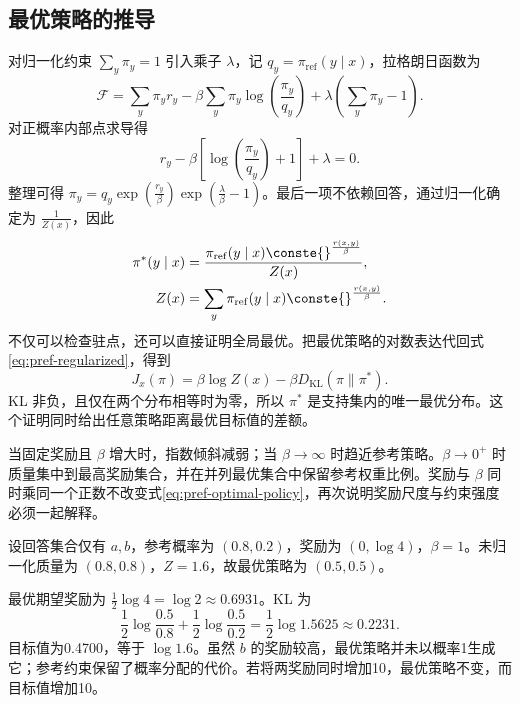 \documentclass[../textbook.tex]{subfiles}
\begin{document}
\subsection{最优策略的推导}
对归一化约束 $\sum_y\pi_y=1$ 引入乘子 $\lambda$，记 $q_y=\pi_{\mathrm{ref}}(y\mid x)$，拉格朗日函数为
\begin{equation}
 \mathcal F=\sum_y\pi_yr_y-\beta\sum_y\pi_y\log(\frac{\pi_y}{q_y})
 +\lambda(\sum_y\pi_y-1).
\end{equation}
对正概率内部点求导得
\begin{equation}
 r_y-\beta[\log(\frac{\pi_y}{q_y})+1]+\lambda=0.
\end{equation}
整理可得 $\pi_y=q_y\exp(\frac{r_y}{\beta})\exp(\frac{\lambda}{\beta}-1)$。最后一项不依赖回答，通过归一化确定为 $\frac{1}{Z(x)}$，因此
\begin{equation}\label{eq:pref-optimal-policy}
\begin{aligned}
 \pi^*(y\mid x) &= \frac{\pi_{\mathrm{ref}}(y\mid x)\conste{}^{\frac{r(x,y)}{\beta}}}{Z(x)}, \\
 Z(x) &= \sum_y\pi_{\mathrm{ref}}(y\mid x)\conste{}^{\frac{r(x,y)}{\beta}}.
\end{aligned}
\end{equation}
不仅可以检查驻点，还可以直接证明全局最优。把最优策略的对数表达代回式\eqref{eq:pref-regularized}，得到
\begin{equation}
 J_x(\pi)=\beta\log Z(x)-\beta D_{\mathrm{KL}}(\pi\|\pi^*).
 \label{eq:pref-optimal-proof}
\end{equation}
KL 非负，且仅在两个分布相等时为零，所以 $\pi^*$ 是支持集内的唯一最优分布。这个证明同时给出任意策略距离最优目标值的差额。

当固定奖励且 $\beta$ 增大时，指数倾斜减弱；当 $\beta\to\infty$ 时趋近参考策略。$\beta\to0^+$ 时质量集中到最高奖励集合，并在并列最优集合中保留参考权重比例。奖励与 $\beta$ 同时乘同一个正数不改变式\eqref{eq:pref-optimal-policy}，再次说明奖励尺度与约束强度必须一起解释。

\begin{example}


设回答集合仅有 $a,b$，参考概率为 $(0.8,0.2)$，奖励为 $(0,\log4)$，$\beta=1$。未归一化质量为 $(0.8,0.8)$，$Z=1.6$，故最优策略为 $(0.5,0.5)$。

最优期望奖励为 $\frac12\log4=\log2\approx0.6931$。KL 为
\begin{equation*}
 \frac12\log\frac{0.5}{0.8}+\frac12\log\frac{0.5}{0.2}
 =\frac12\log1.5625\approx0.2231.
\end{equation*}
目标值为0.4700，等于 $\log1.6$。虽然 $b$ 的奖励较高，最优策略并未以概率1生成它；参考约束保留了概率分配的代价。若将两奖励同时增加10，最优策略不变，而目标值增加10。
\end{example}
\end{document}

